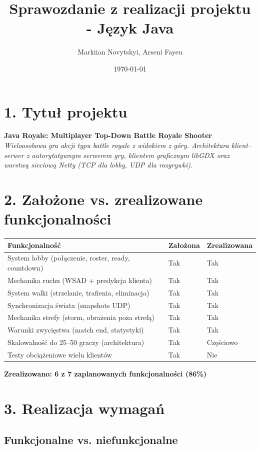 \documentclass[a4paper,12pt]{article}
\title{Sprawozdanie z realizacji projektu - Język Java}
\author{Markiian Novytskyi, Arseni Fayeu}
\date{\today}
\begin{document}
\maketitle

\section*{1. Tytuł projektu}
\textbf{Java Royale: Multiplayer Top-Down Battle Royale Shooter}\\
\textit{Wieloosobowa gra akcji typu battle royale z widokiem z góry. Architektura klient--serwer z autorytatywnym serwerem gry, klientem graficznym libGDX oraz warstwą sieciową Netty (TCP dla lobby, UDP dla rozgrywki).}

\section*{2. Założone vs. zrealizowane funkcjonalności}

\begin{longtable}{|p{6cm}|p{4cm}|p{4cm}|}
\hline
\textbf{Funkcjonalność} & \textbf{Założona} & \textbf{Zrealizowana} \\
\hline
System lobby (połączenie, roster, ready, countdown) & Tak & Tak \\
\hline
Mechanika ruchu (WSAD + predykcja klienta) & Tak & Tak \\
\hline
System walki (strzelanie, trafienia, eliminacja) & Tak & Tak \\
\hline
Synchronizacja świata (snapshots UDP) & Tak & Tak \\
\hline
Mechanika strefy (storm, obrażenia poza strefą) & Tak & Tak \\
\hline
Warunki zwycięstwa (match end, statystyki) & Tak & Tak \\
\hline
Skalowalność do 25--50 graczy (architektura) & Tak & Częściowo \\
\hline
Testy obciążeniowe wielu klientów & Tak & Nie \\
\hline
\end{longtable}

\textbf{Zrealizowano: 6 z 7 zaplanowanych funkcjonalności (86\%)}

\section*{3. Realizacja wymagań}

\subsection*{Funkcjonalne vs. niefunkcjonalne}
\end{document}
